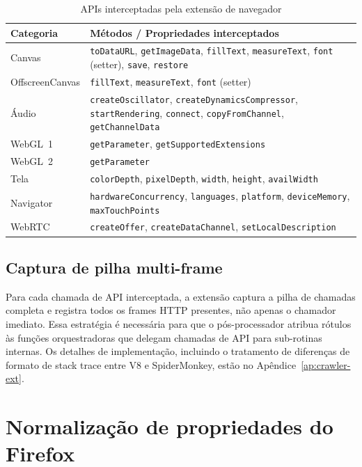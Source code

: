 \begin{table}[htb]
\centering
\caption{APIs interceptadas pela extensão de navegador}
\label{tab:apis}
\begin{tabularx}{\linewidth}{l>{\raggedright\arraybackslash}X}
\toprule
\textbf{Categoria} & \textbf{Métodos / Propriedades interceptados} \\
\midrule
Canvas          & \texttt{toDataURL}, \texttt{getImageData}, \texttt{fillText}, \texttt{measureText}, \texttt{font} (setter), \texttt{save}, \texttt{restore} \\
OffscreenCanvas & \texttt{fillText}, \texttt{measureText}, \texttt{font} (setter) \\
Áudio           & \texttt{createOscillator}, \texttt{createDynamicsCompressor}, \texttt{startRendering}, \texttt{connect}, \texttt{copyFromChannel}, \texttt{getChannelData} \\
WebGL~1         & \texttt{getParameter}, \texttt{getSupportedExtensions} \\
WebGL~2         & \texttt{getParameter} \\
Tela            & \texttt{colorDepth}, \texttt{pixelDepth}, \texttt{width}, \texttt{height}, \texttt{availWidth} \\
Navigator       & \texttt{hardwareConcurrency}, \texttt{languages}, \texttt{platform}, \texttt{deviceMemory}, \texttt{maxTouchPoints} \\
WebRTC          & \texttt{createOffer}, \texttt{createDataChannel}, \texttt{setLocalDescription} \\
\bottomrule
\end{tabularx}
\end{table}

\subsection{Captura de pilha multi-frame}
\label{sub:ext-stack}

Para cada chamada de API interceptada, a extensão captura a pilha de chamadas
completa e registra todos os frames HTTP presentes, não apenas o chamador
imediato. Essa estratégia é necessária para que o pós-processador atribua
rótulos às funções orquestradoras que delegam chamadas de API para sub-rotinas
internas. Os detalhes de implementação, incluindo o tratamento de diferenças de
formato de stack trace entre V8 e SpiderMonkey, estão no
Apêndice~\ref{ap:crawler-ext}.

\section{Normalização de propriedades do Firefox}
\label{sec:normalizacao}

